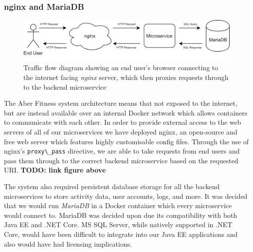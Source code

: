 \subsubsection{nginx and MariaDB}
\begin{figure}[H]
    \centering
    \includegraphics[width=\textwidth]{Images/nginx_proxy_flow.png}
    \caption{Traffic flow diagram showing an end user's browser connecting to the internet facing \textit{nginx} server, which then proxies requests through to the backend microservice}
\end{figure}

The Aber Fitness system architecture means that not exposed to the internet, but are instead available over an internal Docker network which allows containers to communicate with each other. In order to provide external access to the web servers of all of our microservices we have deployed nginx, an open-source and free web server which features highly customisable config files. Through the use of nginx's \lstinline{proxy\_pass} directive, we are able to take requests from end users and pass them through to the correct backend microservice based on the requested URI. \textbf{TODO: link figure above}

The system also required persistent database storage for all the backend microservices to store activity data, user accounts, logs, and more. It was decided that we would run \textit{MariaDB} in a Docker container which every microservice would connect to. MariaDB was decided upon due its compatibility with both Java EE and .NET Core. MS SQL Server, while natively supported in .NET Core, would have been difficult to integrate into our Java EE applications and also would have had licensing implications. 
